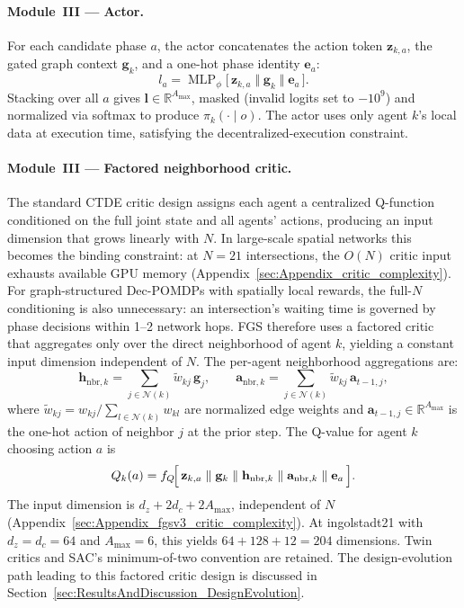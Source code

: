 \paragraph{Module~III — Actor.}
For each candidate phase $a$, the actor concatenates the action token $\mathbf{z}_{k,a}$, the gated graph context $\mathbf{g}_k$, and a one-hot phase identity $\mathbf{e}_a$:
\begin{equation}
  l_a = \operatorname{MLP}_\phi\!\bigl[\,\mathbf{z}_{k,a}\;\Vert\;\mathbf{g}_k\;\Vert\;\mathbf{e}_a\,\bigr].
  \label{eq:fgsv2_actor}
\end{equation}
Stacking over all $a$ gives $\mathbf{l} \in \mathbb{R}^{A_{\max}}$, masked (invalid logits set to $-10^9$) and normalized via softmax to produce $\pi_k(\cdot\mid o)$. The actor uses only agent $k$'s local data at execution time, satisfying the decentralized-execution constraint.

\paragraph{Module~III — Factored neighborhood critic.}
The standard CTDE critic design \citep{lowe2017multi} assigns each agent a centralized Q-function conditioned on the full joint state and all agents' actions, producing an input dimension that grows linearly with $N$. In large-scale spatial networks this becomes the binding constraint: at $N=21$ intersections, the $O(N)$ critic input exhausts available GPU memory (Appendix~\ref{sec:Appendix_critic_complexity}). For graph-structured Dec-POMDPs with spatially local rewards, the full-$N$ conditioning is also unnecessary: an intersection's waiting time is governed by phase decisions within 1--2 network hops. FGS therefore uses a factored critic that aggregates only over the direct neighborhood of agent $k$, yielding a constant input dimension independent of $N$. The per-agent neighborhood aggregations are:
\begin{equation}
  \mathbf{h}_{\mathrm{nbr},k}
  = \sum_{j \in \mathcal{N}(k)} \tilde{w}_{kj}\,\mathbf{g}_j,
  \qquad
  \mathbf{a}_{\mathrm{nbr},k}
  = \sum_{j \in \mathcal{N}(k)} \tilde{w}_{kj}\,\mathbf{a}_{t-1,j},
  \label{eq:fgsv3_nbr_context}
\end{equation}
where $\tilde{w}_{kj} = w_{kj} / \sum_{l \in \mathcal{N}(k)} w_{kl}$ are normalized edge weights and $\mathbf{a}_{t-1,j} \in \mathbb{R}^{A_{\max}}$ is the one-hot action of neighbor $j$ at the prior step. The Q-value for agent $k$ choosing action $a$ is
\begin{equation}
  Q_k(a) = f_Q\!\Bigl[\,
    \mathbf{z}_{k,a}\;\Vert\;
    \mathbf{g}_k\;\Vert\;
    \mathbf{h}_{\mathrm{nbr},k}\;\Vert\;
    \mathbf{a}_{\mathrm{nbr},k}\;\Vert\;
    \mathbf{e}_a
    \,\Bigr].
  \label{eq:fgsv3_critic}
\end{equation}
The input dimension is $d_z + 2d_c + 2A_{\max}$, independent of $N$ (Appendix~\ref{sec:Appendix_fgsv3_critic_complexity}). At ingolstadt21 with $d_z = d_c = 64$ and $A_{\max} = 6$, this yields $64 + 128 + 12 = 204$ dimensions. Twin critics and SAC's minimum-of-two convention are retained. The design-evolution path leading to this factored critic design is discussed in Section~\ref{sec:ResultsAndDiscussion_DesignEvolution}.


